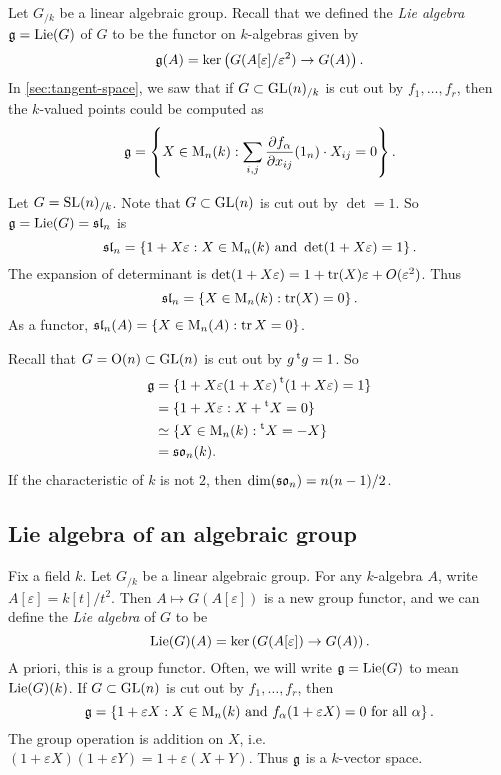Let $G_{/k}$ be a linear algebraic group. Recall that we defined the \emph{Lie 
algebra} $\mathfrak{g}=\operatorname{Lie}(G)$ of $G$ to be the functor on $k$-algebras given by 
\[
  \mathfrak{g}(A) = \ker\left(G(A[\varepsilon]/\varepsilon^2) \to G(A)\right) .
\]
In \autoref{sec:tangent-space}, we saw that if $G\subset \operatorname{GL}(n)_{/k}$ is cut out by 
$f_1,\dots,f_r$, then the $k$-valued points could be computed as 
\[
  \mathfrak{g} = \left\{X\in \operatorname{M}_n(k):\sum_{i,j} \frac{\partial f_\alpha}{\partial x_{i j}}(1_n)\cdot X_{i j}=0\right\} .
\]

\begin{example}
Let $G=\operatorname{SL}(n)_{/k}$. Note that $G\subset \operatorname{GL}(n)$ is cut out by $\det=1$. So 
$\mathfrak{g}=\operatorname{Lie}(G)=\mathfrak{sl}_n$ is 
\[
  \mathfrak{sl}_n = \left\{1+X\varepsilon:X\in \operatorname{M}_n(k)\text{ and }\det(1+X\varepsilon)=1\right\} .
\]
The expansion of determinant is 
$\det(1+X\varepsilon)=1+\operatorname{tr}(X)\varepsilon + O(\varepsilon^2)$. Thus 
\[
  \mathfrak{sl}_n = \left\{X\in \operatorname{M}_n(k):\operatorname{tr}(X)=0\right\} .
\]
As a functor, $\mathfrak{sl}_n(A)=\{X\in \operatorname{M}_n(A):\operatorname{tr} X=0\}$. 
\end{example}

\begin{example}[Orthogonal]
Recall that $G=\operatorname{O}(n)\subset \operatorname{GL}(n)$ is cut out by $g \prescript{\mathrm{t}}{}{g}=1$. So 
\begin{align*}
  \mathfrak{g}
    &= \{1+X\varepsilon  (1+X\varepsilon) \prescript{\mathrm{t}}{}{(1+X\varepsilon)}=1\} \\
    &= \{1+X\varepsilon:X+\prescript{\mathrm{t}}{}{X}=0\} \\
    &\simeq \{X\in \operatorname{M}_n(k):\prescript{\mathrm{t}}{}{X}=-X\} \\
    &= \mathfrak{so}_n(k) .
\end{align*}
If the characteristic of $k$ is not $2$, then $\dim(\mathfrak{so}_n)=n(n-1)/2$. 
\end{example}





\subsection{Lie algebra of an algebraic group}

Fix a field $k$. Let $G_{/k}$ be a linear algebraic group. For any $k$-algebra 
$A$, write $A[\varepsilon]=k[t]/t^2$. Then $A\mapsto G(A[\varepsilon])$ is a 
new group functor, and we can define the \emph{Lie algebra} of $G$ to be 
\[
  \operatorname{Lie}(G)(A) = \ker\left(G(A[\varepsilon]) \to G(A)\right) .
\]
A priori, this is a group functor. Often, we will write $\mathfrak{g}=\operatorname{Lie}(G)$ to mean 
$\operatorname{Lie}(G)(k)$. If $G\subset \operatorname{GL}(n)$ is cut out by $f_1,\dots,f_r$, then 
\[
  \mathfrak{g}=\left\{1+\varepsilon X:X\in \operatorname{M}_n(k)\text{ and }f_\alpha(1+\varepsilon X)=0\text{ for all }\alpha\right\} .
\]
The group operation is addition on $X$, 
i.e.~$(1+\varepsilon X)(1+\varepsilon Y)=1+\varepsilon(X+Y)$. Thus 
$\mathfrak{g}$ is a $k$-vector space. 

